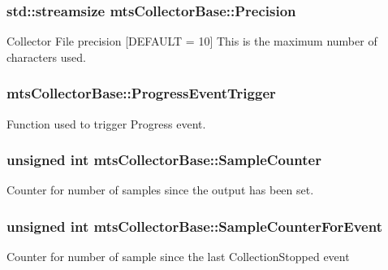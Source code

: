 \subsubsection[{Precision}]{\setlength{\rightskip}{0pt plus 5cm}std\+::streamsize mts\+Collector\+Base\+::\+Precision\hspace{0.3cm}{\ttfamily [protected]}}\label{classmts_collector_base_a86d6b8c24e20957932325ce8183d0abf}
Collector File precision \mbox{[}D\+E\+F\+A\+U\+L\+T = 10\mbox{]} This is the maximum number of characters used. \hypertarget{classmts_collector_base_a038835b577383fbc4b437ff60563b55b}{}
\subsubsection[{Progress\+Event\+Trigger}]{ mts\+Collector\+Base\+::\+Progress\+Event\+Trigger}\label{classmts_collector_base_a038835b577383fbc4b437ff60563b55b}
Function used to trigger Progress event. \hypertarget{classmts_collector_base_a08c8c1889a10cba359bc799bbf5d218b}{}
\subsubsection[{Sample\+Counter}]{\setlength{\rightskip}{0pt plus 5cm}unsigned int mts\+Collector\+Base\+::\+Sample\+Counter\hspace{0.3cm}{\ttfamily [protected]}}\label{classmts_collector_base_a08c8c1889a10cba359bc799bbf5d218b}
Counter for number of samples since the output has been set. \hypertarget{classmts_collector_base_a199b6fdd92f3a5912b6d7fd10af5b205}{}
\subsubsection[{Sample\+Counter\+For\+Event}]{\setlength{\rightskip}{0pt plus 5cm}unsigned int mts\+Collector\+Base\+::\+Sample\+Counter\+For\+Event\hspace{0.3cm}{\ttfamily [protected]}}\label{classmts_collector_base_a199b6fdd92f3a5912b6d7fd10af5b205}
Counter for number of sample since the last Collection\+Stopped event \hypertarget{classmts_collector_base_abf646aaaee11b73bf1fff9f31131fac1}{}
